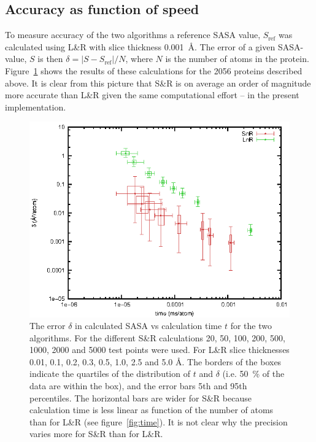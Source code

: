 \documentclass[a4paper,11pt]{article}
\begin{document}
\begin{small}
\subsection{Accuracy as function of speed}\label{sec:accuracy}

To measure accuracy of the two algorithms a reference SASA value,
$S_\text{ref}$ was calculated using L\&R with slice thickness
0.001~Å. The error of a given SASA-value, $S$ is then $\delta = \lvert
S - S_\text{ref} \rvert / N$, where $N$ is the number of atoms in the
protein. Figure~\ref{fig:precision} shows the results of these
calculations for the 2056 proteins described above.  It is clear from
this picture that S\&R is on average an order of magnitude more
accurate than L\&R given the same computational effort -- in the
present implementation.

\begin{figure}
  \begin{center}
  \includegraphics{fig/precision}
  \caption{The error $\delta$ in calculated SASA vs calculation time
    $t$ for the two algorithms. For the different S\&R calculations
    20, 50, 100, 200, 500, 1000, 2000 and 5000 test points were
    used. For L\&R slice thicknesses 0.01, 0.1, 0.2, 0.3, 0.5, 1.0,
    2.5 and 5.0 Å. The borders of the boxes indicate the quartiles of
    the distribution of $t$ and $\delta$ (i.e. 50~\% of the data are
    within the box), and the error bars 5th and 95th percentiles.  The
    horizontal bars are wider for S\&R because calculation time is
    less linear as function of the number of atoms than for L\&R (see
    figure~\ref{fig:time}). It is not clear why the precision varies
    more for S\&R than for L\&R.
    \label{fig:precision}}
  \end{center}
\end{figure}

\end{small}
\end{document}
